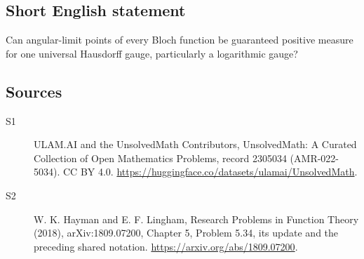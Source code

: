 \documentclass[11pt]{article}
\begin{document}
\subsection{Short English statement}
Can angular-limit points of every Bloch function be guaranteed positive measure for one universal Hausdorff gauge, particularly a logarithmic gauge?
\subsection{Sources}
\begin{description}
\item[\hypertarget{source:2305034:1}{S1}] ULAM.AI and the UnsolvedMath Contributors, UnsolvedMath: A Curated Collection of Open Mathematics Problems, record 2305034 (AMR-022-5034). CC BY 4.0. \url{https://huggingface.co/datasets/ulamai/UnsolvedMath}.
\item[\hypertarget{source:2305034:2}{S2}] W. K. Hayman and E. F. Lingham, Research Problems in Function Theory (2018), arXiv:1809.07200, Chapter 5, Problem 5.34, its update and the preceding shared notation. \url{https://arxiv.org/abs/1809.07200}.
\end{description}
\label{end:2305034}
\end{document}
